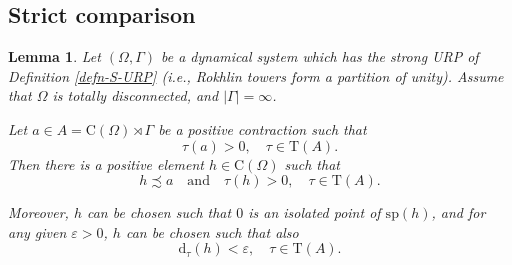 \documentclass[12pt, oneside, psamsfonts]{amsart}
\newtheorem{lem}[thm]{Lemma}
\theoremstyle{definition}
\theoremstyle{remark}
\numberwithin{equation}{section}
\newcommand{\abs}[1]{\left\vert#1\right\vert}
\newcommand{\eps}{\varepsilon}
\newcommand{\tr}{\mathrm{T}}
\begin{document}
\subsection{Strict comparison}
\begin{lem}\label{sub-dom}
Let $(\Omega, \Gamma)$ be a dynamical system which has the strong URP of Definition \ref{defn-S-URP} (i.e., Rokhlin towers form a partition of unity). Assume that $\Omega$ is totally disconnected, and $\abs{\Gamma} = \infty$.

Let $a \in A = \mathrm{C}(\Omega)\rtimes\Gamma$ be a positive contraction  such that $$\tau(a) > 0,\quad \tau \in \tr(A). $$ Then there is a positive element $h \in \mathrm{C}(\Omega)$ such that $$ h \precsim a \quad \textrm{and} \quad \tau(h) > 0, \quad \tau \in \tr(A). $$

Moreover, $h$ can be chosen such that $0$ is an isolated point of $\mathrm{sp}(h)$, and for any given $\eps>0$, $h$ can be chosen such that also $$\mathrm{d}_\tau(h) < \eps,\quad \tau \in \tr(A). $$
\end{lem}
\end{document}
